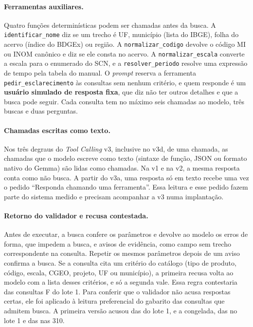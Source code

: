 \paragraph{Ferramentas auxiliares.} Quatro funções determinísticas podem ser chamadas antes da busca. A \texttt{identificar\_nome} diz se um trecho é UF, município (lista do IBGE), folha do acervo (índice do BDGEx) ou região. A \texttt{normalizar\_codigo} devolve o código MI ou INOM canônico e diz se ele consta no acervo. A \texttt{normalizar\_escala} converte a escala para o enumerado do SCN, e a \texttt{resolver\_periodo} resolve uma expressão de tempo pela tabela do manual. O \textit{prompt} reserva a ferramenta \texttt{pedir\_esclarecimento} às consultas sem nenhum critério, e quem responde é um \textbf{usuário simulado de resposta fixa}, que diz não ter outros detalhes e que a busca pode seguir. Cada consulta tem no máximo seis chamadas ao modelo, três buscas e duas perguntas.

\paragraph{Chamadas escritas como texto.} Nos três degraus do \textit{Tool Calling} v3, inclusive no v3d, de uma chamada, as chamadas que o modelo escreve como texto (sintaxe de função, JSON ou formato nativo do Gemma) são lidas como chamadas. Na v1 e na v2, a mesma resposta conta como não busca. A partir do v3a, uma resposta só em texto recebe uma vez o pedido ``Responda chamando uma ferramenta''. Essa leitura e esse pedido fazem parte do sistema medido e precisam acompanhar a v3 numa implantação.

\paragraph{Retorno do validador e recusa contestada.} Antes de executar, a busca confere os parâmetros e devolve ao modelo os erros de forma, que impedem a busca, e avisos de evidência, como campo sem trecho correspondente na consulta. Repetir os mesmos parâmetros depois de um aviso confirma a busca. Se a consulta cita um critério do catálogo (tipo de produto, código, escala, CGEO, projeto, UF ou município), a primeira recusa volta ao modelo com a lista desses critérios, e só a segunda vale. Essa regra contestaria  das  consultas F do lote 1. Para conferir que o validador não acusa respostas certas, ele foi aplicado à leitura preferencial do gabarito das consultas que admitem busca. A primeira versão acusou  das  do lote 1, e a congelada,  das  no lote 1 e  das  nas 310.


